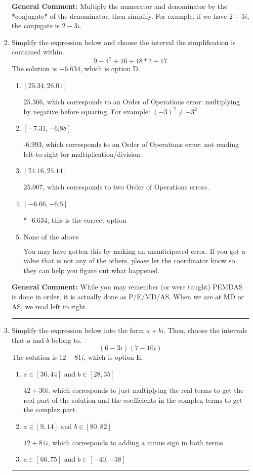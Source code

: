 \documentclass{extbook}[14pt]
\newcommand{\litem}[1]{\item #1

\rule{\textwidth}{0.4pt}}
\begin{document}
\begin{enumerate}
{\textbf{General Comment:} Multiply the numerator and denominator by the *conjugate* of the denominator, then simplify. For example, if we have $2+3i$, the conjugate is $2-3i$.
}
\litem{
Simplify the expression below and choose the interval the simplification is contained within.
\[ 9 - 4^2 + 16 \div 18 * 7 \div 17 \]The solution is \( -6.634 \), which is option D.\begin{enumerate}[label=\Alph*.]
\item \( [25.34, 26.01] \)

 25.366, which corresponds to an Order of Operations error: multiplying by negative before squaring. For example: $(-3)^2 \neq -3^2$
\item \( [-7.31, -6.88] \)

 -6.993, which corresponds to an Order of Operations error: not reading left-to-right for multiplication/division.
\item \( [24.16, 25.14] \)

 25.007, which corresponds to two Order of Operations errors.
\item \( [-6.66, -6.5] \)

* -6.634, this is the correct option
\item \( \text{None of the above} \)

 You may have gotten this by making an unanticipated error. If you got a value that is not any of the others, please let the coordinator know so they can help you figure out what happened.
\end{enumerate}

\textbf{General Comment:} While you may remember (or were taught) PEMDAS is done in order, it is actually done as P/E/MD/AS. When we are at MD or AS, we read left to right.
}
\litem{
Simplify the expression below into the form $a+bi$. Then, choose the intervals that $a$ and $b$ belong to.
\[ (6 - 3 i)(7 - 10 i) \]The solution is \( 12 - 81 i \), which is option E.\begin{enumerate}[label=\Alph*.]
\item \( a \in [36, 44] \text{ and } b \in [28, 35] \)

 $42 + 30 i$, which corresponds to just multiplying the real terms to get the real part of the solution and the coefficients in the complex terms to get the complex part.
\item \( a \in [9, 14] \text{ and } b \in [80, 82] \)

 $12 + 81 i$, which corresponds to adding a minus sign in both terms.
\item \( a \in [66, 75] \text{ and } b \in [-40, -38] \)


\end{enumerate}}
\end{enumerate}
\end{document}
